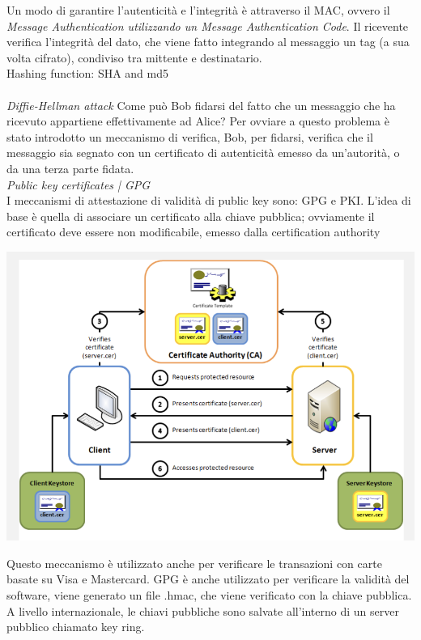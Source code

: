 \documentclass[11pt, oneside]{article}   	%
\begin{document}
Un modo di garantire l'autenticità e l'integrità è attraverso il MAC, ovvero il \emph{Message Authentication utilizzando un Message Authentication Code}. Il ricevente verifica l'integrità del dato, che viene fatto integrando al messaggio un tag (a sua volta cifrato), condiviso tra mittente e destinatario.\\
Hashing function: SHA and md5\\\\
\emph{Diffie-Hellman attack}
Come può Bob fidarsi del fatto che un messaggio che ha ricevuto appartiene effettivamente ad Alice? Per ovviare a questo problema è stato introdotto un meccanismo di verifica, Bob, per fidarsi, verifica che il messaggio sia segnato con un certificato di autenticità emesso da un'autorità, o da una terza parte fidata.\\\emph{Public key certificates | GPG}\\
I meccanismi di attestazione di validità di public key sono: GPG e PKI. L'idea di base è quella di associare un certificato alla chiave pubblica; ovviamente il certificato deve essere non modificabile, emesso dalla certification authority
\begin{center}
\includegraphics[scale=0.7]{asd}
\end{center}
Questo meccanismo è utilizzato anche per verificare le transazioni con carte basate su Visa e Mastercard. GPG è anche utilizzato per verificare la validità del software, viene generato un file .hmac, che viene verificato con la chiave pubblica. A livello internazionale, le chiavi pubbliche sono salvate all'interno di un server pubblico chiamato key ring.\\\\
\end{document}
